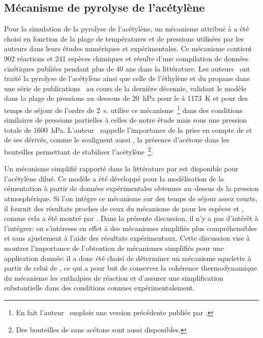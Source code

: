 \subsection{Mécanisme de pyrolyse de l'acétylène}
\label{sec:mecanisme-acetylene}

Pour la simulation de la pyrolyse de l'acétylène, un mécanisme attribué à \citet{Norinaga2009} a été choisi en fonction de la plage de températures et de pressions utilisées par les auteurs dans leurs études numériques et expérimentales. Ce mécanisme contient 902 réactions et 241 espèces chimiques et résulte d'une compilation de données cinétiques publiées pendant plus de 40 ans dans la littérature. Les auteurs~\cite{Norinaga2009} ont traité la pyrolyse de l'acétylène ainsi que celle de l'éthylène et du propane dans une série de publications~\cite{Norinaga2005,Norinaga2007,Norinaga2007ii,Norinaga2009} au cours de la dernière décennie, validant le modèle dans la plage de pressions au--dessous de \SI{20}{\hecto\pascal} pour le  à \SI{1173}{\kelvin} et pour des temps de séjour de l'ordre de \SI{2}{\second}. \citet{Khan2008} utilise ce mécanisme~\footnote{En fait l'auteur~\cite{Khan2008} emploie une version précédente publiée par \citet{Norinaga2007}.} dans des conditions similaires de pressions partielles à celles de notre étude mais sous une pression totale de \SI{1600}{\hecto\pascal}. L'auteur~\cite{Khan2008} rappelle l'importance de la prise en compte de  et de ses dérivés, comme le soulignent aussi \citet{Dimitrijevic2000}, la présence d'acétone dans les bouteilles permettant de stabiliser l'acétylène~\footnote{Des bouteilles de  sans acétone sont aussi disponibles.}. 

Un mécanisme simplifié rapporté dans la littérature par \citet{Graf2007} est disponible pour l'acétylène dilué. Ce modèle a été développé pour la modélisation de la cémentation à partir de données expérimentales obtenues au--dessus de la pression atmosphérique. Si l'on intègre ce mécanisme sur des temps de séjour assez courts, il fournit des résultats proches de ceux du mécanisme de \citet{Norinaga2009} pour les espèces  et , comme cela a été montré par \citet{Khan2008}. Dans la présente discussion, il n'y a pas d'intérêt à l'intégrer: on s'intéresse en effet à des mécanismes simplifiés plus compréhensibles et sans ajustement à l'aide des résultats expérimentaux. Cette discussion vise à montrer l'importance de l'obtention de mécanismes simplifiés pour une application donnée: il a donc été choisi de déterminer un mécanisme squelette à partir de celui de \citet{Norinaga2009}, ce qui a pour but de conserver la cohérence thermodynamique du mécanisme \textendash{} les enthalpies de réaction \textendash{} et d'assurer une simplification substantielle dans des conditions connues expérimentalement.

